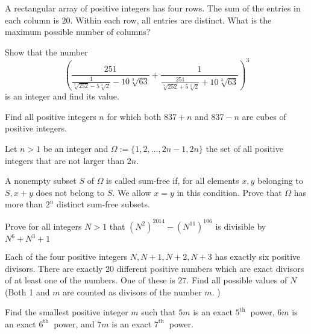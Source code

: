 \documentclass{pset}
\begin{document}
\begin{problems}
\begin{problem}[IrMO 2016 Q7]
    A rectangular array of positive integers has four rows. The sum of the entries in each column is \(20 .\) Within each row, all entries are distinct. What is the maximum possible number of columns?
\end{problem}

\begin{problem}[IrMO 2016 Q9]
    Show that the number
    $$
    \left(\frac{251}{\frac{1}{\sqrt[3]{252}-5 \sqrt[3]{2}}-10 \sqrt[3]{63}}+\frac{1}{\frac{251}{\sqrt[3]{252}+5 \sqrt[3]{2}}+10 \sqrt[3]{63}}\right)^{3}
    $$
    is an integer and find its value.
\end{problem}

\begin{problem}[IrMO 2015 Q3]
    Find all positive integers \(n\) for which both \(837+n\) and \(837-n\) are cubes of positive integers.
\end{problem}

\begin{problem}[IrMO 2015 Q7]
    Let \(n>1\) be an integer and \(\Omega:=\{1,2, \ldots, 2 n-1,2 n\}\) the set of all positive integers that are not larger than \(2 n .\)

    A nonempty subset \(S\) of \(\Omega\) is called sum-free if, for all elements \(x, y\) belonging
    to \(S, x+y\) does not belong to \(S .\) We allow \(x=y\) in this condition. Prove that \(\Omega\) has more than \(2^{n}\) distinct sum-free subsets.
\end{problem}

\begin{problem}[IrMO 2014 Q2]
    Prove for all integers \(N>1\) that \(\left(N^{2}\right)^{2014}-\left(N^{11}\right)^{106}\) is divisible by \(N^{6}+N^{3}+1\)
\end{problem}

\begin{problem}[IrMO 2014 Q2]
    Each of the four positive integers \(N, N+1, N+2, N+3\) has exactly six positive divisors. There are exactly 20 different positive numbers which are exact divisors of at least one of the numbers. One of these is \(27 .\) Find all possible values of \(N\) (Both 1 and \(m\) are counted as divisors of the number \(m .\) )
\end{problem}

\begin{problem}[IrMO 2013 Q1]
    Find the smallest positive integer \(m\) such that \(5 m\) is an exact \(5^{\text {th }}\) power, \(6 m\) is an exact \(6^{\text {th }}\) power, and \(7 m\) is an exact \(7^{\text {th }}\) power.
\end{problem}


\end{problems}
\end{document}
